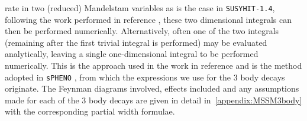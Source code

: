 \documentclass[final,3p,times]{elsarticle}
\begin{document}
rate in two (reduced) Mandelstam variables as is the case in {\tt SUSYHIT-1.4},
following the work performed in reference \cite{Mambrini:2001}, these
two dimensional integrals can then be performed numerically. Alternatively, often
one of the two integrals (remaining after the first trivial integral is 
performed) may be evaluated analytically, leaving a single one-dimensional
integral to be performed numerically. This is the approach used in the work
in reference \cite{Baer:1998} and is the method adopted in {\tt sPHENO} 
\cite{Porod:2003um, Porod:2011}, from which the expressions we use
for the 3 body decays originate. The Feynman diagrams involved, effects
included and any assumptions made for each of the 3 body decays are 
given in detail in~\ref{appendix:MSSM3body} with the corresponding partial
width formulae.
\end{document}
